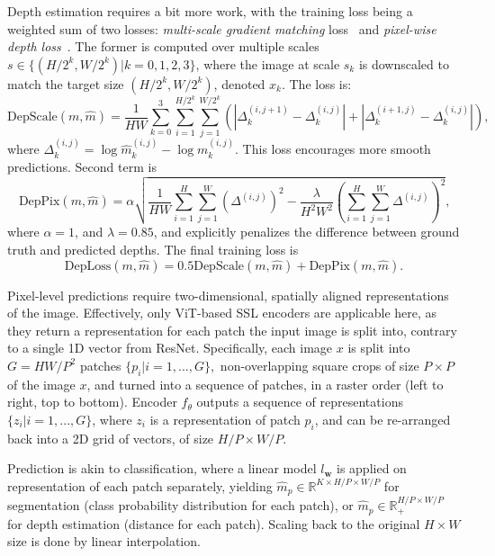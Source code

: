 Depth estimation requires a bit more work, with the training loss being a weighted sum of two losses: \textit{multi-scale gradient matching} loss~\cite{depscaleloss} and \textit{pixel-wise depth loss}~\cite{deppixloss}. The former is computed over multiple scales $s\in\{(H/2^k,W/2^k)|k=0,1,2,3\}$, where the image at scale $s_k$ is downscaled to match the target size $(H/2^k,W/2^k)$, denoted $x_k$. The loss is:
\begin{equation}
    \text{DepScale}(m,\hat{m})=\frac{1}{HW}\sum_{k=0}^{3}
    \sum_{i=1}^{H/2^k}\sum_{j=1}^{W/2^k}\left(
        |\Delta_k^{(i,j+1)}-\Delta_k^{(i,j)}|+
        |\Delta_k^{(i+1,j)}-\Delta_k^{(i,j)}|
    \right)\text{,}
    \label{eq:depth_loss_scale}
\end{equation}
where $\Delta_k^{(i,j)}=\log\hat{m}_k^{(i,j)}-\log m_k^{(i,j)}$. This loss encourages more smooth predictions. Second term is 
\begin{equation}
    \text{DepPix}(m,\hat{m})=\alpha\sqrt{
        \frac{1}{HW}\sum_{i=1}^{H}\sum_{j=1}^{W}\left(\Delta^{(i,j)}\right)^2-
        \frac{\lambda}{H^2W^2}\left(\sum_{i=1}^{H}\sum_{j=1}^{W}\Delta^{(i,j)}\right)^2
    }\text{,}
\end{equation}
where $\alpha=1$, and $\lambda=0.85$, and explicitly penalizes the difference between ground truth and predicted depths. The final training loss is 
\begin{equation}
    \text{DepLoss}(m,\hat{m})=0.5\text{DepScale}(m,\hat{m})+\text{DepPix}(m,\hat{m})\text{.}
    \label{eq:deploss}
\end{equation}

Pixel-level predictions require two-dimensional, spatially aligned representations of the image. Effectively, only ViT-based SSL encoders are applicable here, as they return a representation for each patch the input image is split into, contrary to a single 1D vector from ResNet. Specifically, each image $x$ is split into $G=HW/P^2$ patches $\{p_i|i=1,...,G\}$,~\ie non-overlapping square crops of size $P\times P$ of the image $x$, and turned into a sequence of patches, in a raster order (left to right, top to bottom). Encoder $f_\theta$ outputs a sequence of representations $\{z_i|i=1,...,G\}$, where $z_i$ is a representation of patch $p_i$, and can be re-arranged back into a 2D grid of vectors, of size $H/P\times W/P$.

Prediction is akin to classification, where a linear model $l_\mathbf{w}$ is applied on representation of each patch separately, yielding $\hat{m}_p\in\mathbb{R}^{K\times H/P\times W/P}$ for segmentation (class probability distribution for each patch), or $\hat{m}_p\in\mathbb{R}_+^{H/P\times W/P}$ for depth estimation (distance for each patch). Scaling back to the original $H\times W$ size is done by linear interpolation.

